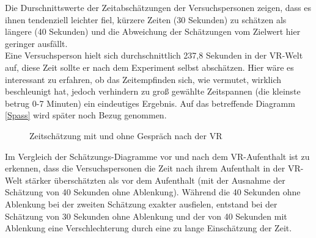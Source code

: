 \documentclass{Paper}
\begin{document}
Die Durschnittswerte der Zeitabschätzungen der Versuchspersonen zeigen, dass es ihnen tendenziell leichter fiel, kürzere Zeiten (30 Sekunden) zu schätzen als längere (40 Sekunden) und die Abweichung der Schätzungen vom Zielwert hier geringer ausfällt.\\
Eine Versuchsperson hielt sich durchschnittlich 237,8 Sekunden in der VR-Welt auf, diese Zeit sollte er nach dem Experiment selbst abschätzen. Hier wäre es interessant zu erfahren, ob das Zeitempfinden sich, wie vermutet, wirklich beschleunigt hat, jedoch verhindern zu groß gewählte Zeitspannen (die kleinste betrug 0-7 Minuten) ein eindeutiges Ergebnis. Auf das betreffende Diagramm \ref{Spass} wird später noch Bezug genommen.
 

\begin{figure}[H]
\caption{Zeitschätzung mit und ohne Gespräch nach der VR}
\label{ZeitNachVR}
\end{figure}

Im Vergleich der Schätzungs-Diagramme vor und nach dem VR-Aufenthalt ist zu erkennen, dass die Versuchspersonen die Zeit nach ihrem Aufenthalt in der VR-Welt stärker überschätzten als vor dem Aufenthalt (mit der Ausnahme der Schätzung von 40 Sekunden ohne Ablenkung). Während die 40 Sekunden ohne Ablenkung bei der zweiten Schätzung exakter ausfielen, entstand bei der Schätzung von 30 Sekunden ohne Ablenkung und der von 40 Sekunden mit Ablenkung eine Verschlechterung durch eine zu lange Einschätzung der Zeit.
\end{document}
